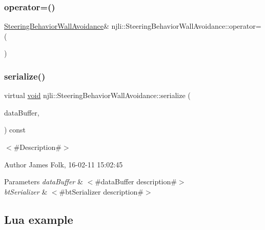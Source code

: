 \subsubsection{\texorpdfstring{operator=()}{operator=()}}
{\footnotesize\ttfamily \mbox{\hyperlink{classnjli_1_1_steering_behavior_wall_avoidance}{Steering\+Behavior\+Wall\+Avoidance}}\& njli\+::\+Steering\+Behavior\+Wall\+Avoidance\+::operator= (\begin{DoxyParamCaption}\item[{const \mbox{\hyperlink{classnjli_1_1_steering_behavior_wall_avoidance}{Steering\+Behavior\+Wall\+Avoidance}} \&}]{ }\end{DoxyParamCaption})\hspace{0.3cm}{\ttfamily [protected]}}

\mbox{\label{classnjli_1_1_steering_behavior_wall_avoidance_a3a442f51bc80974e2ee203561370002a}} 
\subsubsection{\texorpdfstring{serialize()}{serialize()}}
{\footnotesize\ttfamily virtual \mbox{\hyperlink{_thread_8h_af1e856da2e658414cb2456cb6f7ebc66}{void}} njli\+::\+Steering\+Behavior\+Wall\+Avoidance\+::serialize (\begin{DoxyParamCaption}\item[{\mbox{\hyperlink{_thread_8h_af1e856da2e658414cb2456cb6f7ebc66}{void}} $\ast$}]{data\+Buffer,  }\item[{bt\+Serializer $\ast$}]{ }\end{DoxyParamCaption}) const\hspace{0.3cm}{\ttfamily [virtual]}}



$<$\#\+Description\#$>$ 

\begin{DoxyAuthor}{Author}
James Folk, 16-\/02-\/11 15\+:02\+:45
\end{DoxyAuthor}

\begin{DoxyParams}{Parameters}
{\em data\+Buffer} & $<$\#data\+Buffer description\#$>$ \\
\hline
{\em bt\+Serializer} & $<$\#bt\+Serializer description\#$>$\\
\hline
\end{DoxyParams}
\hypertarget{classnjli_1_1_steering_behavior_wander_ex1}{}\subsection{Lua example}\label{classnjli_1_1_steering_behavior_wander_ex1}

